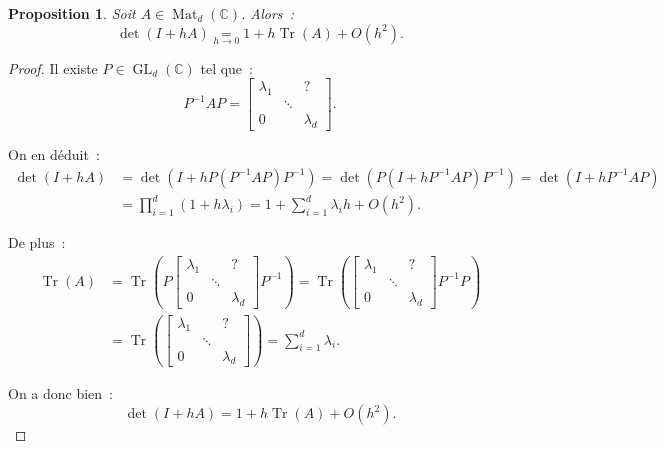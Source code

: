 \documentclass{report}
\newtheorem{prp}[thm]{Proposition}
\theoremstyle{definition}
\theoremstyle{remark}
\numberwithin{equation}{section}
\newcommand{\C}{\mathbb C}
\DeclareMathOperator{\Mat}{Mat}
\DeclareMathOperator{\Tr}{Tr}
\DeclareMathOperator{\GL}{GL}
\begin{document}
		\begin{prp} Soit $A \in \Mat_d(\C)$. Alors~:
		\begin{equation}
			\det(I + hA) \underset{h \to 0}= 1 + h\Tr(A) + O(h^2).
		\end{equation}  %
		\end{prp}

		\begin{proof} Il existe $P \in \GL_d(\C)$ tel que~:
		\begin{equation}
			P^{-1}AP = \begin{bmatrix}\lambda_1 & & ? \\& \ddots & \\0 & & \lambda_d\end{bmatrix}.
		\end{equation}

		On en déduit~:
		\begin{align}
			\det(I + hA) &= \det(I + hP(P^{-1}AP)P^{-1}) = \det\left(P(I + hP^{-1}AP)P^{-1}\right) = \det(I + hP^{-1}AP) \\
			&=\prod_{i=1}^d\left(1 + h\lambda_i\right) = 1 + \sum_{i=1}^d\lambda_ih  + O(h^2).
		\end{align}

		De plus~:
		\begin{align}
			\Tr(A) &= \Tr\left(P\begin{bmatrix}\lambda_1 & & ?\\& \ddots & \\0 & & \lambda_d\end{bmatrix}P^{-1}\right) =
				\Tr\left(\begin{bmatrix}\lambda_1 & & ? \\& \ddots & \\0 & & \lambda_d\end{bmatrix}P^{-1}P\right) \\
			&= \Tr\left(\begin{bmatrix}\lambda_1 & & ? \\ & \ddots & \\0 & & \lambda_d\end{bmatrix}\right) = \sum_{i=1}^d\lambda_i.
		\end{align}

		On a donc bien~:
		\begin{equation}
			\det(I + hA) = 1 + h\Tr(A) + O(h^2).
		\end{equation}
		\end{proof}
\end{document}
